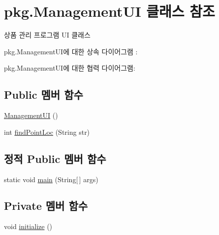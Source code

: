 \hypertarget{classpkg_1_1_management_u_i}{}\section{pkg.\+Management\+UI 클래스 참조}
\label{classpkg_1_1_management_u_i}


상품 관리 프로그램 UI 클래스  




pkg.\+Management\+U\+I에 대한 상속 다이어그램 \+: 


pkg.\+Management\+U\+I에 대한 협력 다이어그램\+:
\subsection*{Public 멤버 함수}
\begin{DoxyCompactItemize}
\item 
\hyperlink{classpkg_1_1_management_u_i_a1076258b72391ffe3fb851248006efc2}{Management\+UI} ()
\item 
int \hyperlink{classpkg_1_1_management_u_i_a23fb9a0d7bae4106d1f604b6035de259}{find\+Point\+Loc} (String str)
\end{DoxyCompactItemize}
\subsection*{정적 Public 멤버 함수}
\begin{DoxyCompactItemize}
\item 
static void \hyperlink{classpkg_1_1_management_u_i_a9a837c7468bd2b6c2fdc67672cdc3ac5}{main} (String\mbox{[}$\,$\mbox{]} args)
\end{DoxyCompactItemize}
\subsection*{Private 멤버 함수}
\begin{DoxyCompactItemize}
\item 
void \hyperlink{classpkg_1_1_management_u_i_ad90e03e0a06bbf65223654eaaada6805}{initialize} ()
\end{DoxyCompactItemize}
